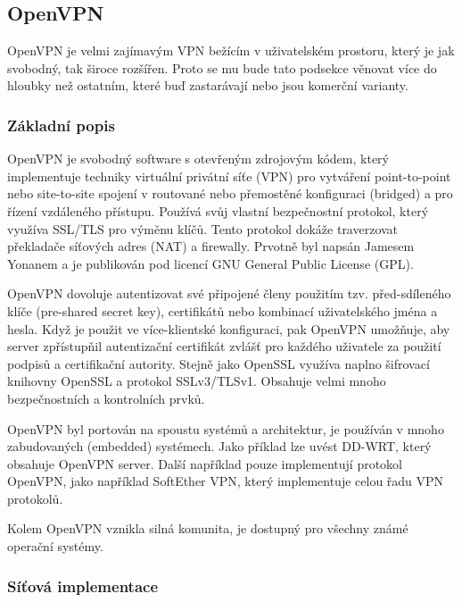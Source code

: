 \documentclass[thesis=B,czech]{FITthesis}[2012/06/26]
\begin{document}
    \subsection{OpenVPN}

      OpenVPN je velmi zajímavým VPN bežícím v uživatelském prostoru, který je jak svobodný, tak široce rozšířen. Proto se mu bude tato podsekce věnovat více do hloubky než ostatním, které buď zastarávají nebo jsou komerční varianty.

      \subsubsection{Základní popis}

        OpenVPN je svobodný software s otevřeným zdrojovým kódem, který implementuje techniky virtuální privátní síťe (VPN) pro vytváření point-to-point nebo site-to-site spojení v routované nebo přemostěné konfiguraci (bridged) a pro řízení vzdáleného přístupu. Používá svůj vlastní bezpečnostní protokol\cite{openvpn_basics_1}, který využíva SSL/TLS pro výměnu klíčů. Tento protokol dokáže traverzovat překladače síťových adres (NAT) a firewally. Prvotně byl napsán Jamesem Yonanem a je publikován pod licencí GNU General Public License (GPL).\cite{openvpn_basics_2}

        OpenVPN dovoluje autentizovat své připojené členy použitím tzv. před-sdíleného klíče (pre-shared secret key), certifikátů nebo kombinací uživatelského jména a hesla. Když je použit ve více-klientské konfiguraci, pak OpenVPN umožňuje, aby server zpřístupňil autentizační certifikát zvlášť pro každého uživatele za použití podpisů a certifikační autority. Stejně jako OpenSSL využíva naplno šifrovací knihovny OpenSSL a protokol SSLv3/TLSv1. Obsahuje velmi mnoho bezpečnostních a kontrolních prvků.

        OpenVPN byl portován na spoustu systémů a architektur, je používán v mnoho zabudovaných (embedded) systémech. Jako příklad lze uvést DD-WRT, který obsahuje OpenVPN server. Další například pouze implementují protokol OpenVPN, jako například SoftEther VPN, který implementuje celou řadu VPN protokolů.

        Kolem OpenVPN vznikla silná komunita, je dostupný pro všechny známé operační systémy.

      \subsubsection{Síťová implementace}
\end{document}
